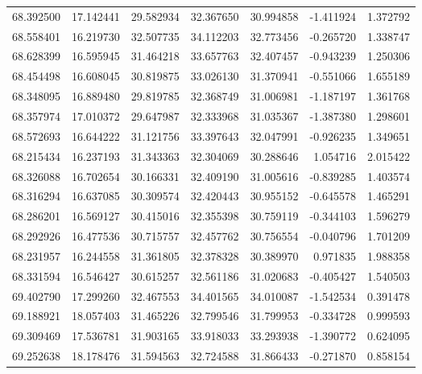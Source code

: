 \begin{tabular}{rrrrrrr}
 68.392500 &  17.142441 &         29.582934 &         32.367650 &         30.994858 & -1.411924 &  1.372792 \\
 68.558401 &  16.219730 &         32.507735 &         34.112203 &         32.773456 & -0.265720 &  1.338747 \\
 68.628399 &  16.595945 &         31.464218 &         33.657763 &         32.407457 & -0.943239 &  1.250306 \\
 68.454498 &  16.608045 &         30.819875 &         33.026130 &         31.370941 & -0.551066 &  1.655189 \\
 68.348095 &  16.889480 &         29.819785 &         32.368749 &         31.006981 & -1.187197 &  1.361768 \\
 68.357974 &  17.010372 &         29.647987 &         32.333968 &         31.035367 & -1.387380 &  1.298601 \\
 68.572693 &  16.644222 &         31.121756 &         33.397643 &         32.047991 & -0.926235 &  1.349651 \\
 68.215434 &  16.237193 &         31.343363 &         32.304069 &         30.288646 &  1.054716 &  2.015422 \\
 68.326088 &  16.702654 &         30.166331 &         32.409190 &         31.005616 & -0.839285 &  1.403574 \\
 68.316294 &  16.637085 &         30.309574 &         32.420443 &         30.955152 & -0.645578 &  1.465291 \\
 68.286201 &  16.569127 &         30.415016 &         32.355398 &         30.759119 & -0.344103 &  1.596279 \\
 68.292926 &  16.477536 &         30.715757 &         32.457762 &         30.756554 & -0.040796 &  1.701209 \\
 68.231957 &  16.244558 &         31.361805 &         32.378328 &         30.389970 &  0.971835 &  1.988358 \\
 68.331594 &  16.546427 &         30.615257 &         32.561186 &         31.020683 & -0.405427 &  1.540503 \\
 69.402790 &  17.299260 &         32.467553 &         34.401565 &         34.010087 & -1.542534 &  0.391478 \\
 69.188921 &  18.057403 &         31.465226 &         32.799546 &         31.799953 & -0.334728 &  0.999593 \\
 69.309469 &  17.536781 &         31.903165 &         33.918033 &         33.293938 & -1.390772 &  0.624095 \\
 69.252638 &  18.178476 &         31.594563 &         32.724588 &         31.866433 & -0.271870 &  0.858154 \\

\end{tabular}
